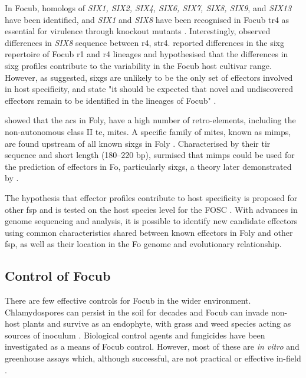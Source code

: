In \ac{Focub}, homologs of \textit{SIX1, SIX2, SIX4, SIX6, SIX7, SIX8, SIX9}, and \textit{SIX13} have been identified, and \textit{SIX1} and \textit{SIX8} have been recognised in \ac{Focub} \ac{tr4} as essential for virulence through knockout mutants \parencite{Widinugraheni2018, An2019}. Interestingly, \textcite{Fraser-smith2014} observed differences in \textit{SIX8} sequence between \ac{r4}, \ac{str4}. \textcite{Czislowski2018} reported differences in the \ac{sixg} repertoire of \ac{Focub} \ac{r1} and \ac{r4} lineages and hypothesised that the differences in \ac{sixg} profiles contribute to the variability in the \ac{Focub} host cultivar range.  However, as suggested, \acp{sixg} are unlikely to be the only set of effectors involved in host specificity, and state "it should be expected that novel and undiscovered effectors remain to be identified in the lineages of \ac{Focub}" \parencite{Czislowski2018}.  

\textcite{Ma2010} showed that the \acp{ac} in \ac{Foly}, have a high number of retro-elements, including the non-autonomous class II \acf{te}, \ac{mites}. A specific family of \ac{mites}, known as \acfp{mimp}, are found upstream of all known \acp{sixg} in \ac{Foly} \parencite{Schmidt2013}. Characterised by their \ac{tir} sequence and short length (180–220 \acs{bp}), \textcite{Schmidt2013} surmised that \acp{mimp} could be used for the prediction of effectors in \ac{Fo}, particularly \acp{sixg}, a theory later demonstrated by \textcite{Dam2016, Dam2017, Armitage2018, FoEC2}.  

The hypothesis that effector profiles contribute to host specificity is proposed for other \ac{fsp} \parencite{Achari2021, Batson2021} and is tested on the host species level for the \ac{FOSC} \parencite{Dam2016}. With advances in genome sequencing and analysis, it is possible to identify new candidate effectors using common characteristics shared between known effectors in \ac{Foly} and other \ac{fsp}, as well as their location in the \ac{Fo} genome and evolutionary relationship.

\subsection{Control of \acl{Focub}}

There are few effective controls for \ac{Focub} in the wider environment. Chlamydospores can persist in the soil for decades and \ac{Focub} can invade non-host plants and survive as an endophyte, with grass and weed species acting as sources of inoculum \parencite{Pegg2019}. Biological control agents and fungicides have been investigated as a means of \ac{Focub} control. However, most of these are \textit{in vitro} and greenhouse assays which, although successful, are not practical or effective in-field \parencite{Dita2018}.  

